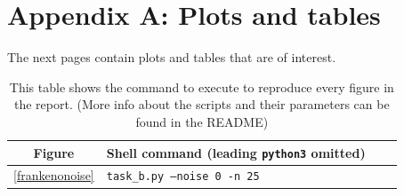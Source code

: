 \documentclass[onecolumn,10pt,cleanfoot]{asme2ej}
\begin{document}



\section*{Appendix A: Plots and tables}

The next pages contain plots and tables that are of interest.

\begin{table}
\caption{This table shows the command to execute to reproduce every figure in the report. (More info about the scripts and their parameters can be found in the README)}
\begin{center}
\label{allparamstable}
\begin{tabular}{c | l l l}
Figure & Shell command (leading \texttt{python3} omitted) \\
\hline
\ref{frankenonoise} & \texttt{task\_b.py --noise 0 -n 25}\\
\hline
\end{tabular}
\end{center}
\end{table}
\end{document}
